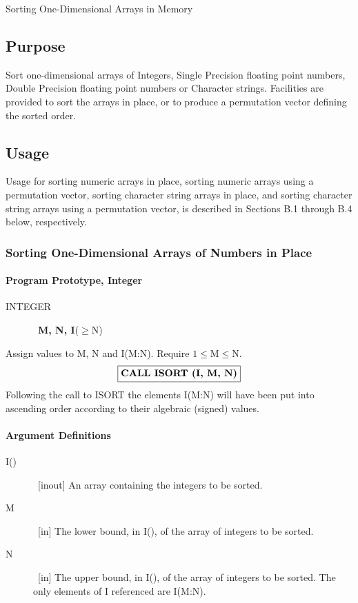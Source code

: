 \documentclass[twoside]{MATH77}
\begin{document}
 Sorting One-Dimensional Arrays in Memory


\subsection{Purpose}

Sort one-dimensional arrays of Integers, Single Precision floating point
numbers, Double Precision floating point numbers or Character strings.
Facilities are provided to sort the arrays in place, or to produce a
permutation vector defining the sorted order.

\subsection{Usage}

Usage for sorting numeric arrays in place, sorting numeric arrays using a
permutation vector, sorting character string arrays in place, and sorting
character string arrays using a permutation vector, is described in Sections
B.1 through B.4 below, respectively.

\subsubsection{Sorting One-Dimensional Arrays of Numbers in Place}

\paragraph{Program Prototype, Integer}

\begin{description}
\item[INTEGER]  \ {\bf M, N, I}($\geq $N)
\end{description}

Assign values to M, N and I(M:N). Require $1\leq \text{M} \leq \text{N}.$
$$
\fbox{{\bf CALL ISORT (I, M, N)}}
$$
Following the call to ISORT the elements I(M:N) will have been put into
ascending order according to their algebraic (signed) values.

\paragraph{Argument Definitions}

\begin{description}
\item[I()]  \ [inout] An array containing the integers to be sorted.

\item[M]  \ [in] The lower bound, in I(), of the array of integers to be
sorted.

\item[N]  \ [in] The upper bound, in I(), of the array of integers to be
sorted. The only elements of I referenced are I(M:N).
\end{description}
\end{document}
